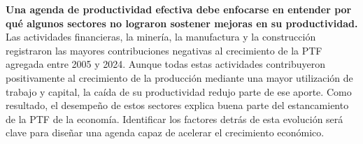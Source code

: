 \documentclass[12pt, a4paper]{article}
\begin{document}
\begin{mdframed}[
  linewidth=1pt,
  linecolor=gray!60,
  backgroundcolor=gray!6,
  innertopmargin=12pt,
  innerbottommargin=12pt,
  innerleftmargin=14pt,
  innerrightmargin=14pt
]
\textbf{Una agenda de productividad efectiva debe enfocarse en entender por qué algunos sectores no lograron sostener mejoras en su productividad.} Las actividades financieras, la minería, la manufactura y la construcción registraron las mayores contribuciones negativas al crecimiento de la PTF agregada entre 2005 y 2024. Aunque todas estas actividades contribuyeron positivamente al crecimiento de la producción mediante una mayor utilización de trabajo y capital, la caída de su productividad redujo parte de ese aporte. Como resultado, el desempeño de estos sectores explica buena parte del estancamiento de la PTF de la economía. Identificar los factores detrás de esta evolución será clave para diseñar una agenda capaz de acelerar el crecimiento económico.
\normalsize
\end{mdframed}

\newpage
\tableofcontents
\newpage


\end{document}

